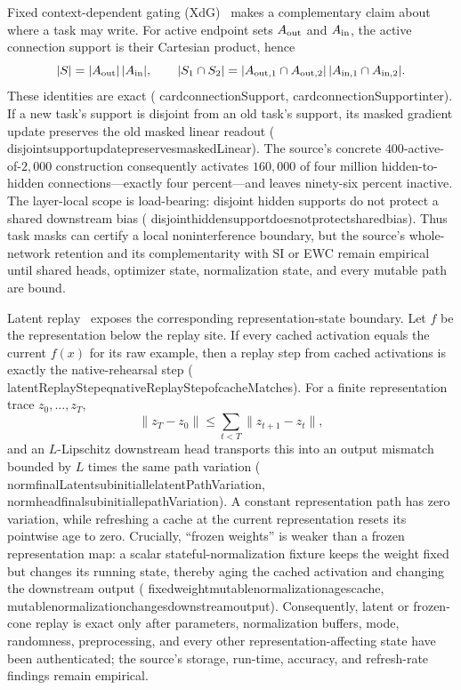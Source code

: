 \documentclass[11pt]{article}
\newcommand{\leanname}[1]{{\scriptsize\ttfamily
  \def\_{\textunderscore\allowbreak}#1}}
\begin{document}
Fixed context-dependent gating (XdG)~\cite{masse2018xdg} makes a complementary
claim about where a task may write.  For active endpoint sets $A_{\rm out}$ and
$A_{\rm in}$, the active connection support is their Cartesian product, hence
\[
  |S|=|A_{\rm out}|\,|A_{\rm in}|,\qquad
  |S_1\cap S_2|
   =|A_{{\rm out},1}\cap A_{{\rm out},2}|\,
    |A_{{\rm in},1}\cap A_{{\rm in},2}|.
\]
These identities are exact
(\leanname{card\_connectionSupport},
\leanname{card\_connectionSupport\_inter}).  If a new task's support is
disjoint from an old task's support, its masked gradient update preserves the
old masked linear readout
(\leanname{disjoint\_support\_update\_preserves\_maskedLinear}).
The source's concrete $400$-active-of-$2{,}000$ construction consequently
activates $160{,}000$ of four million hidden-to-hidden connections---exactly
four percent---and leaves ninety-six percent inactive.  The layer-local scope
is load-bearing: disjoint hidden supports do not protect a shared downstream
bias
(\leanname{disjoint\_hidden\_support\_does\_not\_protect\_shared\_bias}).
Thus task masks can certify a local noninterference boundary, but the source's
whole-network retention and its complementarity with SI or EWC remain
empirical until shared heads, optimizer state, normalization state, and every
mutable path are bound.

Latent replay~\cite{pellegrini2020latent} exposes the corresponding
representation-state boundary.  Let $f$ be the representation below the replay
site.  If every cached activation equals the current $f(x)$ for its raw example,
then a replay step from cached activations is exactly the native-rehearsal step
(\leanname{latentReplayStep\_eq\_nativeReplayStep\_of\_cacheMatches}).
For a finite representation trace $z_0,\ldots,z_T$,
\[
  \lVert z_T-z_0\rVert
    \le \sum_{t<T}\lVert z_{t+1}-z_t\rVert ,
\]
and an $L$-Lipschitz downstream head transports this into an output mismatch
bounded by $L$ times the same path variation
(\leanname{norm\_finalLatent\_sub\_initial\_le\_latentPathVariation},
\leanname{norm\_head\_final\_sub\_initial\_le\_pathVariation}).
A constant representation path has zero variation, while refreshing a cache at
the current representation resets its pointwise age to zero.  Crucially,
``frozen weights'' is weaker than a frozen representation map: a scalar
stateful-normalization fixture keeps the weight fixed but changes its running
state, thereby aging the cached activation and changing the downstream output
(\leanname{fixed\_weight\_mutable\_normalization\_ages\_cache},
\leanname{mutable\_normalization\_changes\_downstream\_output}).
Consequently, latent or frozen-cone replay is exact only after parameters,
normalization buffers, mode, randomness, preprocessing, and every other
representation-affecting state have been authenticated; the source's storage,
run-time, accuracy, and refresh-rate findings remain empirical.
\end{document}
